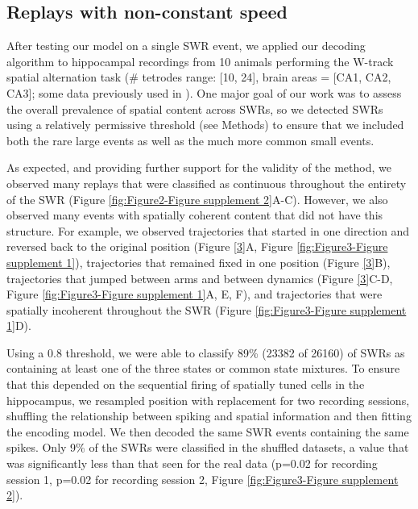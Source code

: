 \documentclass[times, twoside]{zHenriquesLab-StyleBioRxiv}
\begin{document}
\subsection*{Replays with non-constant speed}

After testing our model on a single SWR event, we applied our decoding algorithm to hippocampal recordings from 10 animals performing the W-track spatial alternation task (\# tetrodes range: [10, 24], brain areas = [CA1, CA2, CA3]; some data previously used in \cite{KarlssonAwakereplayremote2009, KayConstantSubsecondCycling2020, CarrTransientSlowGamma2012}). One major goal of our work was to assess the overall prevalence of spatial content across SWRs, so we detected SWRs using a relatively permissive threshold (see Methods) to ensure that we included both the rare large events as well as the much more common small events. 

As expected, and providing further support for the validity of the method, we observed many replays that were classified as continuous throughout the entirety of the SWR (Figure \ref{fig:Figure2-Figure supplement 2}A-C). However, we also observed many events with spatially coherent content that did not have this structure. For example, we observed trajectories that started in one direction and reversed back to the original position (Figure \ref{3}A, Figure \ref{fig:Figure3-Figure supplement 1}), trajectories that remained fixed in one position (Figure \ref{3}B), trajectories that jumped between arms and between dynamics (Figure \ref{3}C-D, Figure \ref{fig:Figure3-Figure supplement 1}A, E, F), and trajectories that were spatially incoherent throughout the SWR (Figure \ref{fig:Figure3-Figure supplement 1}D).

Using a 0.8 threshold, we were able to classify 89\% (23382 of 26160) of SWRs as containing at least one of the three states or common state mixtures. To ensure that this depended on the sequential firing of spatially tuned cells in the hippocampus, we resampled position with replacement for two recording sessions, shuffling the relationship between spiking and spatial information and then fitting the encoding model. We then decoded the same SWR events containing the same spikes. Only 9\% of the SWRs were classified in the shuffled datasets, a value that was significantly less than that seen for the real data (p=0.02 for recording session 1, p=0.02 for recording session 2, Figure \ref{fig:Figure3-Figure supplement 2}).
\end{document}
